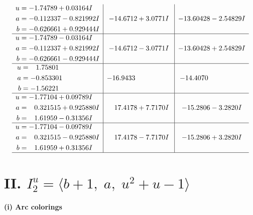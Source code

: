 \documentclass[1p]{elsarticle_modified}
\theoremstyle{definition}
\begin{document}
$$\begin{array}{c|c|c}
\begin{aligned}
u &= -1.74789 + 0.03164 I \\
a &= -0.112337 - 0.821992 I \\
b &= -0.626661 + 0.929444 I\end{aligned}
 & -14.6712 + 3.0771 I & -13.60428 - 2.54829 I \\ \hline\begin{aligned}
u &= -1.74789 - 0.03164 I \\
a &= -0.112337 + 0.821992 I \\
b &= -0.626661 - 0.929444 I\end{aligned}
 & -14.6712 - 3.0771 I & -13.60428 + 2.54829 I \\ \hline\begin{aligned}
u &= \phantom{-}1.75801\phantom{ +0.000000I} \\
a &= -0.853301\phantom{ +0.000000I} \\
b &= -1.56221\phantom{ +0.000000I}\end{aligned}
 & -16.9433\phantom{ +0.000000I} & -14.4070\phantom{ +0.000000I} \\ \hline\begin{aligned}
u &= -1.77104 + 0.09789 I \\
a &= \phantom{-}0.321515 + 0.925880 I \\
b &= \phantom{-}1.61959 - 0.31356 I\end{aligned}
 & \phantom{-}17.4178 + 7.7170 I & -15.2806 - 3.2820 I \\ \hline\begin{aligned}
u &= -1.77104 - 0.09789 I \\
a &= \phantom{-}0.321515 - 0.925880 I \\
b &= \phantom{-}1.61959 + 0.31356 I\end{aligned}
 & \phantom{-}17.4178 - 7.7170 I & -15.2806 + 3.2820 I\\
 \hline 
 \end{array}$$\newpage\newpage\renewcommand{\arraystretch}{1}
\centering \section*{II. $I^u_{2}= \langle b+1,\;a,\;u^2+u-1 \rangle$}
\flushleft \textbf{(i) Arc colorings}\\
\end{document}
